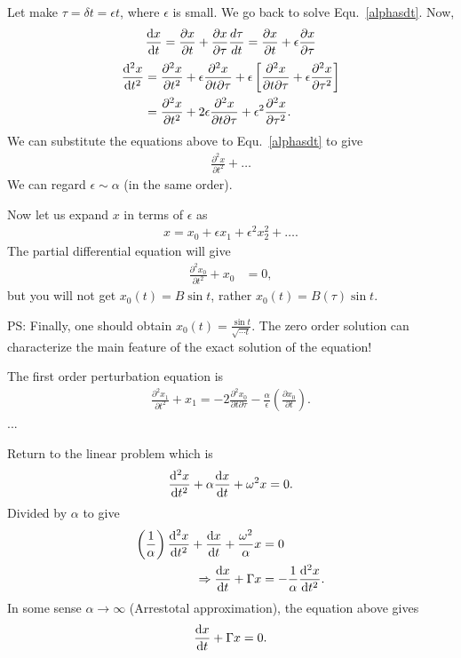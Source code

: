Let make $ \tau =\delta t = \epsilon t $, where $ \epsilon  $ is small. We go back to solve Equ.~\eqref{alphasdt}. Now, 
\begin{align}
\frac{{\mathrm d} {x }}{{\mathrm d}t} = \frac{\partial x}{\partial t}+ \frac{\partial x}{\partial \tau}\frac{d\tau}{dt}= \frac{\partial x}{\partial t}+ \epsilon \frac{\partial x}{\partial \tau}\label {singularp1}
\end{align}
\begin{align}
\frac{{\mathrm d}^2 {x}}{{\mathrm d}t^2} &= \frac{\partial ^2 x}{\partial t^2}+ \epsilon \frac{\partial ^2 x}{\partial t \partial \tau} + \epsilon \left[ \frac{\partial ^2 x}{\partial t \partial \tau}+ \epsilon \frac{\partial ^2 x}{\partial \tau ^2}\right] \\
&=\frac{\partial ^2 x}{\partial t^2} + 2\epsilon \frac{\partial ^2 x}{\partial t \partial \tau}+ \epsilon^2  \frac{\partial ^2 x}{\partial \tau^2}.\label{singularp2}
\end{align}
We can substitute the equations above to Equ.~\eqref{alphasdt} to give
\begin{align}
\frac{\partial ^2 x}{\partial t^2}+ \ldots 
\end{align}
We can regard $\epsilon \sim \alpha $ (in the same order). 

Now let us expand $ x $ in terms of $ \epsilon $ as 
\begin{align}
x=x_0 + \epsilon x_1 + \epsilon^2 x_2^2 + \ldots .
\end{align}
The partial differential equation will give 
\begin{align}
\frac{\partial ^2 x_0 }{\partial t^2}+ x_0 &= 0,\label {partialpert1}
\end{align}
but you will not get $ x_0(t)=B\sin t $, rather $ x_0 (t)= B(\tau) \sin t $. 

PS: Finally, one should obtain $ x_0(t)=\frac{\sin t}{\sqrt{\cdots t}} $. The zero order solution can characterize the main feature of the exact solution of the equation!

The first order perturbation equation is
\begin{align}
\frac{\partial ^2 x_1}{\partial t^2} +x_1 = -2 \frac{\partial ^2 x_0}{\partial t \partial \tau} - \frac{\alpha}{\epsilon} \left( \frac{\partial x_0}{\partial t}\right) . \label {partialpert2}
\end{align}
...

Return to the linear problem which is 
\begin{align}
\frac{{\mathrm d}^2 {x}}{{\mathrm d}t^2} + \alpha \frac{{\mathrm d} {x}}{{\mathrm d}t} + \omega^2 x=0.\label {sdewithomega}
\end{align}
Divided by $ \alpha $ to give
\begin{align}
\left( \dfrac{1}{\alpha}\right)\frac{{\mathrm d}^2 {x}}{{\mathrm d}t^2} + \frac{{\mathrm d} {x}}{{\mathrm d}t} + \frac{\omega^2}{\alpha}x &=0 \\
\Rightarrow \frac{{\mathrm d} {x}}{{\mathrm d}t} + \Gamma x &= -\frac{1}{\alpha } \frac{{\mathrm d}^2 {x}}{{\mathrm d}t^2}.
\end{align}
In some sense $ \alpha \rightarrow \infty $ (Arrestotal approximation), the equation above gives
\begin{align}
\frac{{\mathrm d} {x}}{{\mathrm d}t} +\Gamma x=0.  \label {Gammaapprox}
\end{align}

